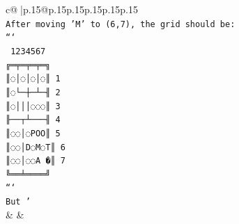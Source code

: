 \documentclass{article}
\begin{document}
{\begin{supertabular}{c@{$\;$}|p{.15\linewidth}@{}p{.15\linewidth}p{.15\linewidth}p{.15\linewidth}p{.15\linewidth}p{.15\linewidth}}
{{{\\ 
\texttt{After moving 'M' to (6,7), the grid should be:} \\
\texttt{```} \\
\texttt{ 1234567} \\
\texttt{╔═╤═╤═╤═╗} \\
\texttt{║◌│◌│◌│◌║ 1} \\
\texttt{║◌└─┼─┴─╢ 2} \\
\texttt{║◌│││◌◌◌║ 3} \\
\texttt{╟──┬┴───╢ 4} \\
\texttt{║◌◌│◌POO║ 5} \\
\texttt{║◌◌│D◌M◌T║ 6} \\
\texttt{║◌◌│◌◌A �║ 7} \\
\texttt{╚══╧════╝} \\
\texttt{```} \\
\texttt{But '} \\
            }
        }
    }
    & & \\ \\


\end{supertabular}}
\end{document}
